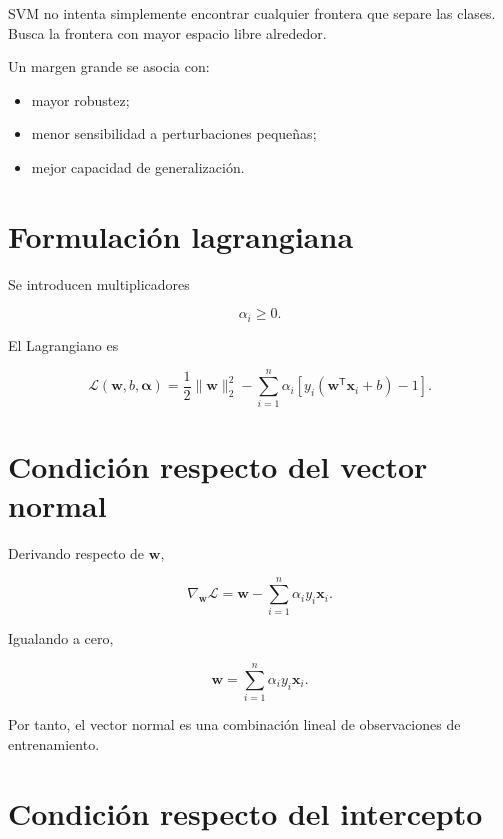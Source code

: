 \documentclass[
  spanish,
  10.5pt,
  letterpaper,
  DIV=11,
  numbers=noendperiod,
  oneside,
  open=any]{scrreprt}
\providecommand{\tightlist}{%
  \setlength{\itemsep}{0pt}\setlength{\parskip}{0pt}}
\theoremstyle{definition}
\theoremstyle{definition}
\theoremstyle{plain}
\theoremstyle{remark}
\begin{document}
SVM no intenta simplemente encontrar cualquier frontera que separe las
clases. Busca la frontera con mayor espacio libre alrededor.

Un margen grande se asocia con:

\begin{itemize}
\tightlist
\item
  mayor robustez;
\item
  menor sensibilidad a perturbaciones pequeñas;
\item
  mejor capacidad de generalización.
\end{itemize}

\section*{Formulación lagrangiana}\label{formulaciuxf3n-lagrangiana}


Se introducen multiplicadores

\[
\alpha_i\geq 0.
\]

El Lagrangiano es

\[
\mathcal{L}
(\mathbf{w},b,\boldsymbol{\alpha})
=
\frac{1}{2}\|\mathbf{w}\|_2^2
-
\sum_{i=1}^{n}
\alpha_i
\left[
y_i
\left(
\mathbf{w}^{\mathsf T}\mathbf{x}_i+b
\right)
-1
\right].
\]

\section*{Condición respecto del vector
normal}\label{condiciuxf3n-respecto-del-vector-normal}


Derivando respecto de \(\mathbf{w}\),

\[
\nabla_{\mathbf{w}}\mathcal{L}
=
\mathbf{w}
-
\sum_{i=1}^{n}
\alpha_i y_i\mathbf{x}_i.
\]

Igualando a cero,

\[
\mathbf{w}
=
\sum_{i=1}^{n}
\alpha_i y_i\mathbf{x}_i.
\]

Por tanto, el vector normal es una combinación lineal de observaciones
de entrenamiento.

\section*{Condición respecto del
intercepto}\label{condiciuxf3n-respecto-del-intercepto}
\end{document}
